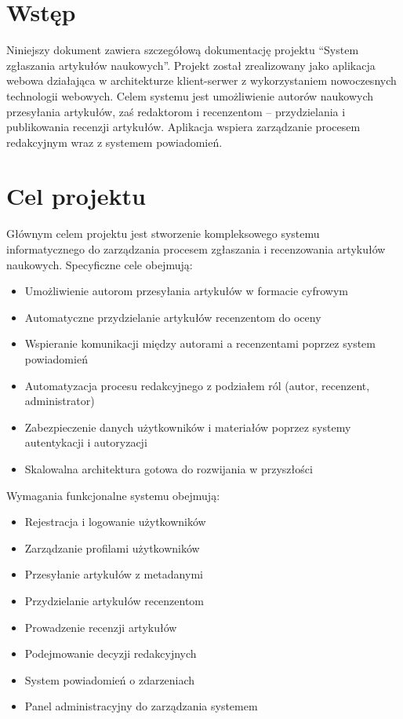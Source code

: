 \documentclass[times]{san}
\begin{document}
\maketitlepage
\spistresci

\section{Wstęp}

Niniejszy dokument zawiera szczegółową dokumentację projektu ``System zgłaszania artykułów naukowych''. Projekt został zrealizowany jako aplikacja webowa działająca w architekturze klient-serwer z wykorzystaniem nowoczesnych technologii webowych. Celem systemu jest umożliwienie autorów naukowych przesyłania artykułów, zaś redaktorom i recenzentom -- przydzielania i publikowania recenzji artykułów. Aplikacja wspiera zarządzanie procesem redakcyjnym wraz z systemem powiadomień.

\section{Cel projektu}

Głównym celem projektu jest stworzenie kompleksowego systemu informatycznego do zarządzania procesem zgłaszania i recenzowania artykułów naukowych. Specyficzne cele obejmują:

\begin{itemize}
    \item Umożliwienie autorom przesyłania artykułów w formacie cyfrowym
    \item Automatyczne przydzielanie artykułów recenzentom do oceny
    \item Wspieranie komunikacji między autorami a recenzentami poprzez system powiadomień
    \item Automatyzacja procesu redakcyjnego z podziałem ról (autor, recenzent, administrator)
    \item Zabezpieczenie danych użytkowników i materiałów poprzez systemy autentykacji i autoryzacji
    \item Skalowalna architektura gotowa do rozwijania w przyszłości
\end{itemize}

Wymagania funkcjonalne systemu obejmują:
\begin{itemize}
    \item Rejestracja i logowanie użytkowników
    \item Zarządzanie profilami użytkowników
    \item Przesyłanie artykułów z metadanymi
    \item Przydzielanie artykułów recenzentom
    \item Prowadzenie recenzji artykułów
    \item Podejmowanie decyzji redakcyjnych
    \item System powiadomień o zdarzeniach
    \item Panel administracyjny do zarządzania systemem
\end{itemize}
\end{document}
